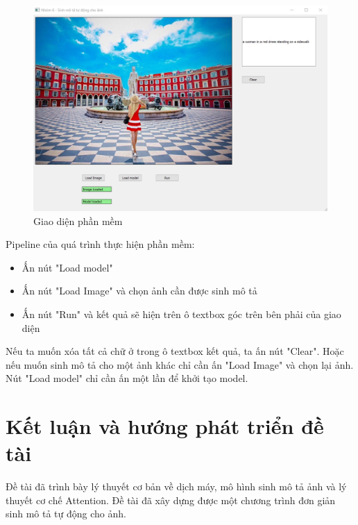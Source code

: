 \documentclass[14pt, a4paper]{article}
\numberwithin{equation}{section}
\numberwithin{algorithm}{section}
\numberwithin{figure}{section}
\numberwithin{table}{section}
\numberwithin{dl}{section}
\numberwithin{md}{section}
\numberwithin{bd}{section}
\numberwithin{dn}{section}
\numberwithin{hq}{section}
\begin{document}
    \begin{figure}[h!] \centering

        \includegraphics[scale=0.5]{UI.jpg}
        \caption{Giao diện phần mềm}
        \label{fig:UI}

    \end{figure}

    Pipeline của quá trình thực hiện phần mềm:

    \begin{itemize}
        \item Ấn nút "Load model"
        \item Ấn nút "Load Image" và chọn ảnh cần được sinh mô tả
        \item Ấn nút "Run" và kết quả sẽ hiện trên ô textbox góc trên bên phải của giao diện
    \end{itemize}

    Nếu ta muốn xóa tất cả chữ ở trong ô textbox kết quả, ta ấn nút "Clear". 
    Hoặc nếu muốn sinh mô tả cho một ảnh khác chỉ cần ấn "Load Image" và chọn lại ảnh. 
    Nút "Load model" chỉ cần ấn một lần để khởi tạo model.

    \section{Kết luận và hướng phát triển đề tài}

    Đề tài đã trình bày lý thuyết cơ bản về dịch máy, mô hình sinh mô tả ảnh và lý thuyết cơ chế Attention.
    Đề tài đã xây dựng được một chương trình đơn giản sinh mô tả tự động cho ảnh.

    \newpage
    \printbibliography[title={TÀI LIỆU THAM KHẢO}]

\end{document}
